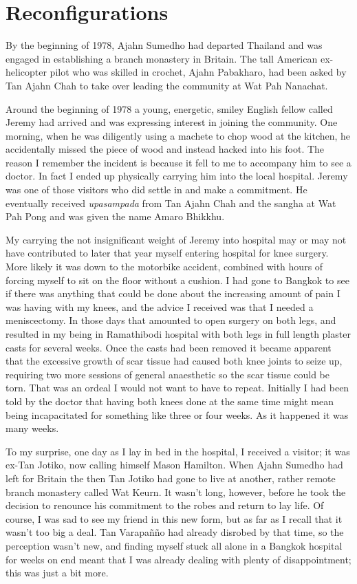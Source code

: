 \chapter{Reconfigurations}

By the beginning of 1978, Ajahn Sumedho had departed Thailand and was
engaged in establishing a branch monastery in Britain. The tall American
ex-helicopter pilot who was skilled in crochet, Ajahn Pabakharo, had
been asked by Tan Ajahn Chah to take over leading the community at Wat
Pah Nanachat.

Around the beginning of 1978 a young, energetic, smiley English fellow
called Jeremy had arrived and was expressing interest in joining the
community. One morning, when he was diligently using a machete to chop
wood at the kitchen, he accidentally missed the piece of wood and
instead hacked into his foot. The reason I remember the incident is
because it fell to me to accompany him to see a doctor. In fact I ended
up physically carrying him into the local hospital. Jeremy was one of
those visitors who did settle in and make a commitment. He eventually
received \emph{upasampada} from Tan Ajahn Chah and the sangha at Wat Pah
Pong and was given the name Amaro Bhikkhu.

My carrying the not insignificant weight of Jeremy into hospital may or
may not have contributed to later that year myself entering hospital for
knee surgery. More likely it was down to the motorbike accident,
combined with hours of forcing myself to sit on the floor without a
cushion. I had gone to Bangkok to see if there was anything that could
be done about the increasing amount of pain I was having with my knees,
and the advice I received was that I needed a meniscectomy. In those
days that amounted to open surgery on both legs, and resulted in my
being in Ramathibodi hospital with both legs in full length plaster
casts for several weeks. Once the casts had been removed it became
apparent that the excessive growth of scar tissue had caused both knee
joints to seize up, requiring two more sessions of general anaesthetic
so the scar tissue could be torn. That was an ordeal I would not want to
have to repeat. Initially I had been told by the doctor that having both
knees done at the same time might mean being incapacitated for something
like three or four weeks. As it happened it was many weeks.

To my surprise, one day as I lay in bed in the hospital, I received a
visitor; it was ex-Tan Jotiko, now calling himself Mason Hamilton. When
Ajahn Sumedho had left for Britain the then Tan Jotiko had gone to live
at another, rather remote branch monastery called Wat Keurn. It wasn't
long, however, before he took the decision to renounce his commitment to
the robes and return to lay life. Of course, I was sad to see my friend
in this new form, but as far as I recall that it wasn't too big a deal.
Tan Varapañño had already disrobed by that time, so the perception
wasn't new, and finding myself stuck all alone in a Bangkok hospital for
weeks on end meant that I was already dealing with plenty of
disappointment; this was just a bit more.

